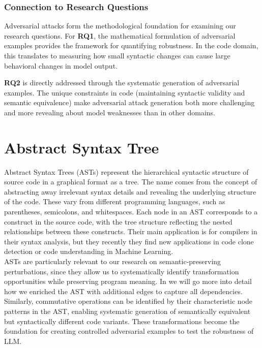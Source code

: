 \documentclass[%
thesis=student,%
coverpage=false,%
titlepage=false,%
headmarks=true, %
english,%
font=libertine, %
math=newpxtx, %
BCOR=5mm,%
coverBCOR=11mm%
]{tum-templates/book/tumbook}
\begin{document}
\subsubsection{Connection to Research Questions}

Adversarial attacks form the methodological foundation for examining our research questions. For \textbf{RQ1}, the mathematical formulation of adversarial examples provides the framework for quantifying robustness. In the code domain, this translates to measuring how small syntactic changes can cause large behavioral changes in model output.

\textbf{RQ2} is directly addressed through the systematic generation of adversarial examples. The unique constraints in code (maintaining syntactic validity and semantic equivalence) make adversarial attack generation both more challenging and more revealing about model weaknesses than in other domains.

\section{Abstract Syntax Tree}
\label{sec:AST}

Abstract Syntax Trees (ASTs) represent the hierarchical syntactic structure of source code in a graphical format as a tree. The name comes from the concept of abstracting away irrelevant syntax details and revealing the underlying structure of the code. These vary from different programming languages, such as parentheses, semicolons, and whitespaces. 
Each node in an AST corresponds to a construct in the source code, with the tree structure reflecting the nested relationships between these constructs. Their main application is for compilers in their syntax analysis, but they recently they find new applications in code clone detection or code understanding in Machine Learning. \\
ASTs are particularly relevant to our research on semantic-preserving perturbations, since they allow us to systematically identify transformation opportunities while preserving program meaning. In  we will go more into detail how we enriched the AST with additional edges to capture all dependencies.\\
Similarly, commutative operations can be identified by their characteristic node patterns in the AST, enabling systematic generation of semantically equivalent but syntactically different code variants. These transformations become the foundation for creating controlled adversarial examples to test the robustness of LLM.
\end{document}
